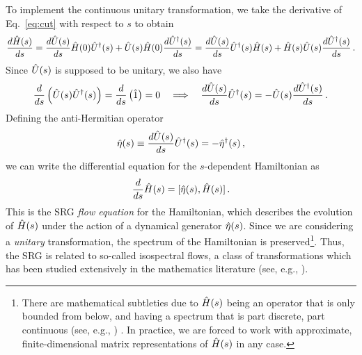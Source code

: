 To implement the continuous unitary transformation, we take the derivative of
Eq.~\eqref{eq:cut} with respect to $s$ to obtain 
\begin{equation}
   \frac{d {\hat{H}(s)}} {d {s}}  =  \frac{d {\hat{U}(s)}} {d {s}} \hat{H}(0)\hat{U}^\dag(s) + \hat{U}(s)\hat{H}(0) \frac{d {\hat{U}^\dag(s)}} {d {s}} 
                   =  \frac{d {\hat{U}(s)}} {d {s}} \hat{U}^\dag(s)\hat{H}(s) + \hat{H}(s)\hat{U}(s) \frac{d {\hat{U}^\dag(s)}} {d {s}} \,.
\end{equation}
Since $\hat{U}(s)$ is supposed to be unitary, we also have
\begin{equation}
   \frac{d {}} {d {s}} \left(\hat{U}(s)\hat{U}^\dag(s)\right) =  \frac{d {}} {d {s}}  \left(\hat{1}\right) = 0 \quad \Longrightarrow 
  \quad  \frac{d {\hat{U}(s)}} {d {s}} \hat{U}^\dag(s) = - \hat{U}(s) \frac{d {\hat{U}^\dag(s)}} {d {s}} \,.
\end{equation}
Defining the anti-Hermitian operator
\begin{equation}\label{eq:def_eta}
  \etaO(s) \equiv \totd{\UO(s)}{s} \UUO(s) = - \eetaO(s)\,,
\end{equation}
we can write the differential equation for the $s$-dependent Hamiltonian as
\begin{equation} \label{eq:opflow}
  \totd{}{s} \HO(s) = \comm{\etaO(s)}{\HO(s)}\,.
\end{equation}
This is the SRG \emph{flow equation} for the Hamiltonian, which describes the 
evolution of $\hat{H}(s)$ under the action of a dynamical generator $\hat{\eta}(s)$. 
Since we are considering a \emph{unitary} transformation, the spectrum of the 
Hamiltonian is preserved\footnote{There are mathematical subtleties due to 
$\hat{H}(s)$ being an operator that is only bounded from below, and having a 
spectrum that is part discrete, part continuous (see, e.g., \cite{Bach:2010zr,Boutin:2016ef})
. In practice, we are forced
to work with approximate, finite-dimensional matrix representations of $\hat{H}(s)$
in any case.}. Thus, the SRG is related to so-called isospectral flows, a class 
of transformations which has been studied extensively in the mathematics literature 
(see, e.g., \cite{Brockett:1991kx,Chu:1994vn,Chu:1995ys,Bach:2010zr,Boutin:2016ef}).

